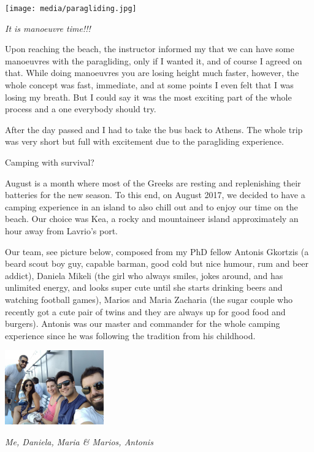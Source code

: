 \documentclass[10pt,a4paper]{article} %
\newcommand{\NewsItem}[1]{ %
\usefont{T1}{fvs}{n}{n} %
\vspace{24pt}\large #1\vspace{3pt} %
\par \normalsize \normalfont}
\begin{document}
\begin{multicols}{3}
\begin{center}
	\texttt{[image: media/paragliding.jpg]}
	\par\textit{It is manoeuvre time!!!}
\end{center}


Upon reaching the beach, the instructor informed my that we can have some manoeuvres 
with the paragliding, only if I wanted it, and of course I agreed on that. 
While doing manoeuvres you are losing height much faster, however, the whole concept 
was fast, immediate, and at some points I even felt that I was losing my breath. 
But I could say it was the most exciting part of the whole process and a one everybody 
should try. 


After the day passed and I had to take the bus back to Athens. 
The whole trip was very short but full with excitement due to the paragliding 
experience.

\NewsItem{Camping with survival?}

August is a month where most of the Greeks are resting and replenishing their 
batteries for the new season. 
To this end, on August 2017, we decided to have a camping experience in an island to also chill 
out and to enjoy our time on the beach. 
Our choice was Kea, a rocky and mountaineer island approximately an hour away 
from Lavrio's port.


Our team, see picture below, composed from my PhD fellow Antonis Gkortzis 
(a beard scout boy guy, capable barman, good cold but nice humour, rum and beer addict), 
Daniela Mikeli (the girl who always smiles, jokes around, and has unlimited energy, 
and looks super cute until she starts drinking beers and watching football games), 
Marios and Maria Zacharia (the sugar couple who recently got a cute pair of twins 
and they are always up for good food and burgers).  
Antonis was our master and commander for the whole camping experience since he was 
following the tradition from his childhood. 


\begin{center}
	\includegraphics[width=0.32\textwidth]{media/the_dream_team.jpg}
	\par\textit{Me, Daniela, Maria \& Marios, Antonis}
\end{center}



\end{multicols}
\end{document}
